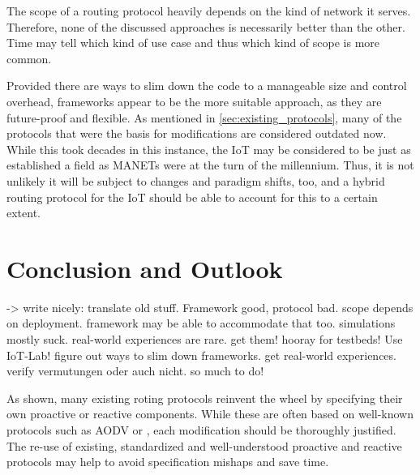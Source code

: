 \documentclass[a4paper,10pt]{scrartcl}
\begin{document}
The scope of a routing protocol heavily depends on the kind of network it serves. Therefore, none of the discussed approaches is necessarily better than the other. Time may tell which kind of use case and thus which kind of scope is more common.

Provided there are ways to slim down the code to a manageable size and control overhead, frameworks appear to be the more suitable approach, as they are future-proof and flexible. As mentioned in \ref{sec:existing_protocols}, many of the protocols that were the basis for modifications are considered outdated now. While this took decades in this instance, the IoT may be considered to be just as established a field as MANETs were at the turn of the millennium. Thus, it is not unlikely it will be subject to changes and paradigm shifts, too, and a hybrid routing protocol for the IoT should be able to account for this to a certain extent.

\section{Conclusion and Outlook}
\label{sec:conclusion}
-> write nicely: translate old stuff. Framework good, protocol bad. scope depends on deployment. framework may be able to accommodate that too. simulations mostly suck. real-world experiences are rare. get them!  hooray for testbeds! Use IoT-Lab!
figure out ways to slim down frameworks. get real-world experiences. verify vermutungen oder auch nicht. so much to do!

As shown, many existing roting protocols reinvent the wheel by specifying their own proactive or reactive components. While these are often based on well-known protocols such as AODV or , each modification should be thoroughly justified. The re-use of existing, standardized and well-understood proactive and reactive protocols may help to avoid specification mishaps and save time.



\printglossaries

{\small


}
\end{document}
